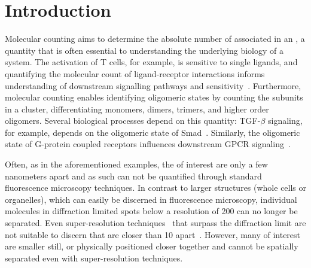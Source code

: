 \section{Introduction}



%
Molecular counting aims to determine the absolute number of \smallobjects
associated in an \object, a quantity that is often essential to understanding
the underlying biology of a system.
  The activation of T cells, for example, is sensitive to single ligands, and
  quantifying the molecular count of ligand-receptor interactions informs
  understanding of downstream signalling pathways and
  sensitivity~\citep{irvine_2002}.
  Furthermore, molecular counting enables identifying oligomeric states by
  counting the subunits in a cluster, differentiating monomers, dimers,
  trimers, and higher order oligomers.
  Several biological processes depend on this quantity: TGF-$\beta$ signaling,
  for example, depends on the oligomeric state of Smad~\citep{inman_2002,
  moustakas_2002}.
  Similarly, the oligomeric state of G-protein coupled receptors influences
  downstream GPCR signaling~\citep{felce_2018, breitwieser_2004}.

%
Often, as in the aforementioned examples, the \smallobjects of interest are only a few
nanometers apart and as such can not be quantified through standard fluorescence
microscopy techniques.
  In contrast to larger structures (whole cells or organelles), which can
  easily be discerned in fluorescence microscopy, individual molecules in
  diffraction limited spots below a resolution of 200 \nanometer can no longer
  be separated.
  Even super-resolution techniques~\citep{betzig_2006,rust_2006} that surpass
  the diffraction limit are not suitable to discern \smallobjects that are
  closer than 10 \nanometer apart~\citep{valli_seeing_2021}.
  However, many \objects of interest are smaller still, or physically
  positioned closer together and cannot be spatially separated even with
  super-resolution techniques.

